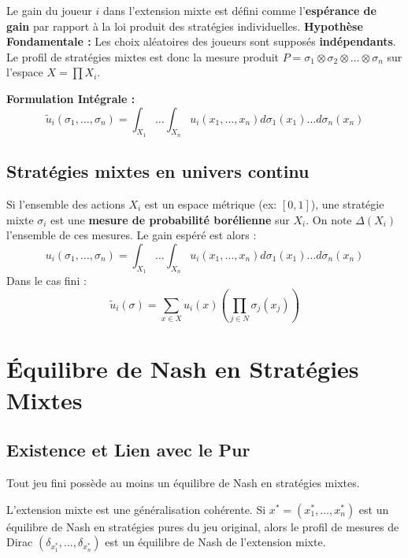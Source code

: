 \begin{definition}
Le gain du joueur $i$ dans l'extension mixte est défini comme l'\textbf{espérance de gain} par rapport à la loi produit des stratégies individuelles.
\textbf{Hypothèse Fondamentale :} Les choix aléatoires des joueurs sont supposés \textbf{indépendants}. Le profil de stratégies mixtes est donc la mesure produit $P = \sigma_1 \otimes \sigma_2 \otimes \dots \otimes \sigma_n$ sur l'espace $X = \prod X_i$.

\textbf{Formulation Intégrale :}
$$\tilde{u}_i(\sigma_1, \dots, \sigma_n) = \int_{X_1} \dots \int_{X_n} u_i(x_1, \dots, x_n) d\sigma_1(x_1) \dots d\sigma_n(x_n)$$

\subsection{Stratégies mixtes en univers continu}
Si l'ensemble des actions $X_i$ est un espace métrique (ex: $[0,1]$), une stratégie mixte $\sigma_i$ est une \textbf{mesure de probabilité borélienne} sur $X_i$.
On note $\Delta(X_i)$ l'ensemble de ces mesures. Le gain espéré est alors :
\[ u_i(\sigma_1, \dots, \sigma_n) = \int_{X_1} \dots \int_{X_n} u_i(x_1, \dots, x_n) d\sigma_1(x_1) \dots d\sigma_n(x_n) \]
Dans le cas fini :
$$\tilde{u}_i(\sigma) = \sum_{x \in X} u_i(x) \left( \prod_{j \in N} \sigma_j(x_j) \right)$$
\end{definition}

\section{Équilibre de Nash en Stratégies Mixtes}

\subsection{Existence et Lien avec le Pur}
\begin{theoreme}[Nash, 1950]
Tout jeu fini possède au moins un équilibre de Nash en stratégies mixtes.
\end{theoreme}

\begin{proposition}
L'extension mixte est une généralisation cohérente.
Si $x^* = (x^*_1, \dots, x^*_n)$ est un équilibre de Nash en stratégies pures du jeu original, alors le profil de mesures de Dirac $(\delta_{x^*_1}, \dots, \delta_{x^*_n})$ est un équilibre de Nash de l'extension mixte.
\end{proposition}

